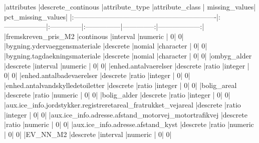 \documentclass{report}
\begin{document}
\begin{Schunk}
\begin{Soutput}
|attributes                                                    |descrete_continous |attribute_type |attribute_class | missing_values| pct_missing_values|
|:-------------------------------------------------------------|:------------------|:--------------|:---------------|--------------:|------------------:|
|fremskreven_pris_M2                                           |continous          |interval       |numeric         |              0|                  0|
|bygning.ydervaeggensmateriale                                 |descrete           |nomial         |character       |              0|                  0|
|bygning.tagdaekningsmateriale                                 |descrete           |nomial         |character       |              0|                  0|
|ombyg_alder                                                   |descrete           |interval       |numeric         |              0|                  0|
|enhed.antalvaerelser                                          |descrete           |ratio          |integer         |              0|                  0|
|enhed.antalbadevaerelser                                      |descrete           |ratio          |integer         |              0|                  0|
|enhed.antalvandskylledetoiletter                              |descrete           |ratio          |integer         |              0|                  0|
|bolig_areal                                                   |descrete           |ratio          |numeric         |              0|                  0|
|bolig_alder                                                   |descrete           |ratio          |integer         |              0|                  0|
|aux.ice_info.jordstykker.registreretareal_fratrukket_vejareal |descrete           |ratio          |integer         |              0|                  0|
|aux.ice_info.adresse.afstand_motorvej_motortrafikvej          |descrete           |ratio          |numeric         |              0|                  0|
|aux.ice_info.adresse.afstand_kyst                             |descrete           |ratio          |numeric         |              0|                  0|
|EV_NN_M2                                                      |descrete           |interval       |numeric         |              0|                  0|
\end{Soutput}
\end{Schunk}
\end{document}
